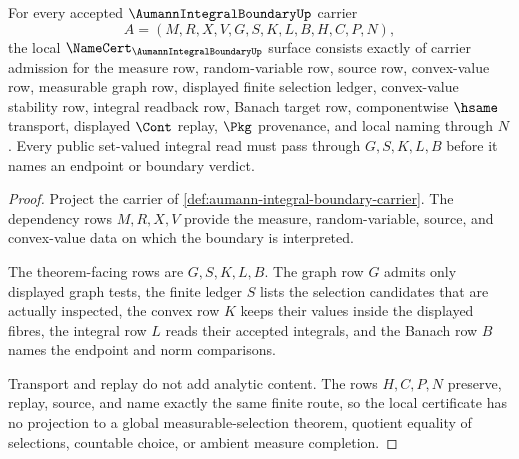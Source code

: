\begin{theorem}
\label{thm:aumann-integral-boundary-obligations}
For every accepted $\AumannIntegralBoundaryUp$ carrier
$$
A=(M,R,X,V,G,S,K,L,B,H,C,P,N),
$$
the local $\NameCert_{\AumannIntegralBoundaryUp}$ surface consists exactly of carrier admission for the measure row, random-variable row, source row, convex-value row, measurable graph row, displayed finite selection ledger, convex-value stability row, integral readback row, Banach target row, componentwise $\hsame$ transport, displayed $\Cont$ replay, $\Pkg$ provenance, and local naming through $N$. Every public set-valued integral read must pass through $G,S,K,L,B$ before it names an endpoint or boundary verdict.
\end{theorem}
\begin{proof}
Project the carrier of \autoref{def:aumann-integral-boundary-carrier}. The dependency rows $M,R,X,V$ provide the measure, random-variable, source, and convex-value data on which the boundary is interpreted.

The theorem-facing rows are $G,S,K,L,B$. The graph row $G$ admits only displayed graph tests, the finite ledger $S$ lists the selection candidates that are actually inspected, the convex row $K$ keeps their values inside the displayed fibres, the integral row $L$ reads their accepted integrals, and the Banach row $B$ names the endpoint and norm comparisons.

Transport and replay do not add analytic content. The rows $H,C,P,N$ preserve, replay, source, and name exactly the same finite route, so the local certificate has no projection to a global measurable-selection theorem, quotient equality of selections, countable choice, or ambient measure completion.
\end{proof}


\begin{closurestatus}{\AumannIntegralBoundaryUp}
  \theoryclosure{\seedClosure}
  \formalstatus{\unformalizedV}
\end{closurestatus}
